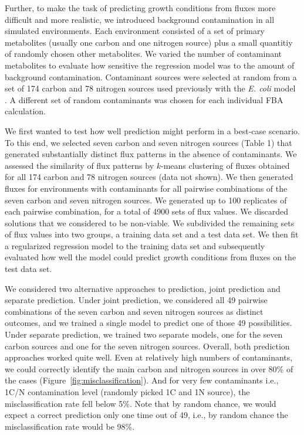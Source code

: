 \documentclass[12pt]{article}
\begin{document}
Further, to make the task of predicting growth conditions from fluxes more difficult and more realistic, we introduced background contamination in all simulated environments. Each environment consisted of a set of primary metabolites (usually one carbon and one nitrogen source) plus a small quantitiy of randomly chosen other metabolites. We varied the number of contaminant metabolites to evaluate how sensitive the regression model was to the amount of background contamination. Contaminant sources were selected at random from a set of 174 carbon and 78 nitrogen sources used previously with the \emph{E. coli} model \cite{Feistetal2007}. A different set of random contaminants was chosen for each individual FBA calculation.

We first wanted to test how well prediction might perform in a best-case scenario. To this end, we selected seven carbon and seven nitrogen sources (Table 1) that generated substantially distinct flux patterns in the absence of contaminants. We assessed the similarity of flux patterns by $k$-means clustering of fluxes obtained for all 174 carbon and 78 nitrogen sources (data not shown). We then generated fluxes for environments with contaminants for all pairwise combinations of the seven carbon and seven nitrogen sources. We generated up to 100 replicates of each pairwise combination, for a total of 4900 sets of flux values. We discarded solutions that we considered to be non-viable. We subdivided the remaining sets of flux values into two groups, a training data set and a test data set. We then fit a regularized regression model to the training data set and subsequently evaluated how well the model could predict growth conditions from fluxes on the test data set.

We considered two alternative approaches to prediction, joint prediction and separate prediction. Under joint prediction, we considered all 49 pairwise combinations of the seven carbon and seven nitrogen sources as distinct outcomes, and we trained a single model to predict one of those 49 possibilities. Under separate prediction, we trained two separate models, one for the seven carbon sources and one for the seven nitrogen sources. Overall, both prediction approaches worked quite well.  Even at relatively high numbers of contaminants, we could correctly identify the main carbon and nitrogen sources in over 80\% of the cases (Figure~\ref{fig:misclassification}). And for very few contaminants i.e., 1C/N contamination level (randomly picked 1C and 1N source), the misclassification rate fell below 5\%. Note that by random chance, we would expect a correct prediction only one time out of 49, i.e., by random chance the misclassification rate would be 98\%.
\end{document}
